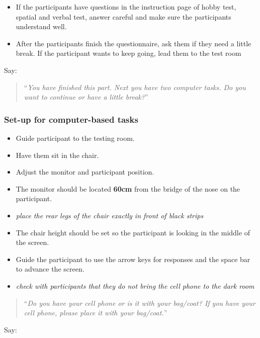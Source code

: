 \documentclass[]{article}
\providecommand{\tightlist}{%
  \setlength{\itemsep}{0pt}\setlength{\parskip}{0pt}}
\begin{document}
\begin{itemize}
\tightlist
\item
  If the participants have questions in the instruction page of hobby
  test, spatial and verbal test, answer careful and make sure the
  participants understand well.
\item
  After the participants finish the questionnaire, ask them if they need
  a little break. If the participant wants to keep going, lead them to
  the test room
\end{itemize}

Say:

\begin{quote}
``\emph{You have finished this part. Next you have two computer tasks.
Do you want to continue or have a little break?}''
\end{quote}

\subsubsection{Set-up for computer-based
tasks}\label{set-up-for-computer-based-tasks-1}

\begin{itemize}
\tightlist
\item
  Guide participant to the testing room.
\item
  Have them sit in the chair.
\item
  Adjust the monitor and participant position.
\item
  The monitor should be located \textbf{60cm} from the bridge of the
  nose on the participant.
\item
  \emph{place the rear legs of the chair exactly in front of black
  strips}
\item
  The chair height should be set so the participant is looking in the
  middle of the screen.
\item
  Guide the participant to use the arrow keys for responses and the
  space bar to advance the screen.
\item
  \emph{check with participants that they do not bring the cell phone to
  the dark room}
\end{itemize}

\begin{quote}
``\emph{Do you have your cell phone or is it with your bag/coat? If you
have your cell phone, please place it with your bag/coat.}''
\end{quote}

Say:
\end{document}
